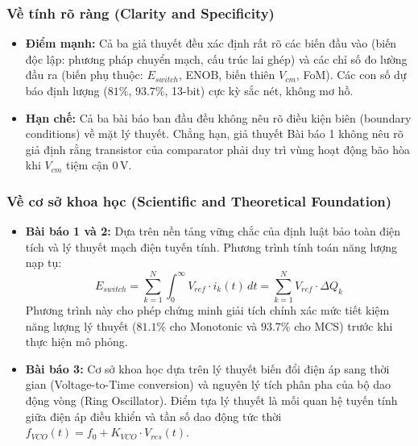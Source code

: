 \documentclass[12pt,a4paper]{article}
\begin{document}
\subsubsection{Về tính rõ ràng (Clarity and Specificity)}
\begin{itemize}
    \item \textbf{Điểm mạnh:} Cả ba giả thuyết đều xác định rất rõ các biến đầu vào (biến độc lập: phương pháp chuyển mạch, cấu trúc lai ghép) và các chỉ số đo lường đầu ra (biến phụ thuộc: $E_{switch}$, ENOB, biến thiên $V_{cm}$, FoM). Các con số dự báo định lượng ($81\%$, $93.7\%$, 13-bit) cực kỳ sắc nét, không mơ hồ.
    \item \textbf{Hạn chế:} Cả ba bài báo ban đầu đều không nêu rõ điều kiện biên (boundary conditions) về mặt lý thuyết. Chẳng hạn, giả thuyết Bài báo 1 không nêu rõ giả định rằng transistor của comparator phải duy trì vùng hoạt động bão hòa khi $V_{cm}$ tiệm cận $0\,\text{V}$.
\end{itemize}

\subsubsection{Về cơ sở khoa học (Scientific and Theoretical Foundation)}
\begin{itemize}
    \item \textbf{Bài báo 1 và 2:} Dựa trên nền tảng vững chắc của định luật bảo toàn điện tích và lý thuyết mạch điện tuyến tính. Phương trình tính toán năng lượng nạp tụ:
    \begin{equation}
        E_{switch} = \sum_{k=1}^{N} \int_0^\infty V_{ref} \cdot i_k(t) \, dt = \sum_{k=1}^{N} V_{ref} \cdot \Delta Q_k
    \end{equation}
    Phương trình này cho phép chứng minh giải tích chính xác mức tiết kiệm năng lượng lý thuyết ($81.1\%$ cho Monotonic và $93.7\%$ cho MCS) trước khi thực hiện mô phỏng.
    \item \textbf{Bài báo 3:} Cơ sở khoa học dựa trên lý thuyết biến đổi điện áp sang thời gian (Voltage-to-Time conversion) và nguyên lý tích phân pha của bộ dao động vòng (Ring Oscillator). Điểm tựa lý thuyết là mối quan hệ tuyến tính giữa điện áp điều khiển và tần số dao động tức thời $f_{VCO}(t) = f_0 + K_{VCO} \cdot V_{res}(t)$.
\end{itemize}
\end{document}
